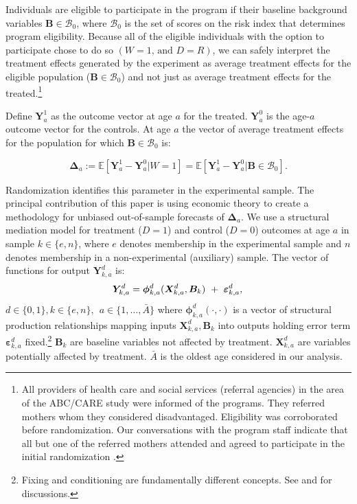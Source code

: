 Individuals are eligible to participate in the program if their baseline background variables $\bm{B}\in\mathcal{B}_0$, where $\mathcal{B}_0$ is the set of scores on the risk index that determines program eligibility. Because all of the eligible individuals with the option to participate chose to do so $(W=1\text{, and } D=R)$, we can safely interpret the treatment effects generated by the experiment as average treatment effects for the eligible population ($\bm{B}\in\mathcal{B}_0$) and not just as average treatment effects for the treated.\footnote{All providers of health care and social services (referral agencies) in the area of the ABC/CARE study were informed of the programs. They referred mothers whom they considered disadvantaged. Eligibility was corroborated before randomization. Our conversations with the program staff indicate that all but one of the referred mothers attended and agreed to participate in the initial randomization \citep{Ramey-etal_2012-ABC}.}

Define $\bm{Y}^1_a$ as the outcome vector at age $a$ for the treated. $\bm{Y}^0_a$ is the age-$a$ outcome vector for the controls. At age $a$ the vector of average treatment effects for the population for which $\bm{B}\in\mathcal{B}_0$ is:

\begin{equation}
\bm{\Delta}_a  := \mathbb{E} \left[ \bm{Y}^1_a - \bm{Y}^0_a | W = 1 \right] = \mathbb{E} \left[\bm{Y}^1_a - \bm{Y}^0_{a} | \bm{B} \in \mathcal{B}_0 \right]. \label{eq:mainte}
\end{equation}

Randomization identifies this parameter in the experimental sample. The principal contribution of this paper is using economic theory to create a methodology for unbiased out-of-sample forecasts of $\bm{\Delta}_a$. We use a structural mediation model for treatment ($D=1$) and control ($D=0$) outcomes at age $a$ in sample $k \in \{e,n\}$, where $e$ denotes membership in the experimental sample and $n$ denotes membership in a non-experimental (auxiliary) sample. The vector of functions for output $\bm{Y}^d_{k,a}$ is:
\begin{equation}
\bm{Y}^d_{k,a} = \bm{\phi}^d_{k,a} (\bm{X}^d_{k,a}, \bm{B}_k) \ + \ \bm{\varepsilon}^d_{k,a},  \label{eq:outcome} \\
\end{equation}
$d \in\{0,1\},  k\in\{e,n\}, \ \ a\in\{1,\dots,\bar{A}\}$ where $\bm{\phi}^d_{k,a}\left( \cdot, \cdot \right)$ is a vector of structural production relationships mapping inputs $\bm{X}^d_{k,a}, \bm{B}_k$ into outputs holding error term $\bm{\varepsilon}^d_{k,a}$ fixed.\footnote{Fixing and conditioning are fundamentally different concepts. See \cite{Haavelmo_1943_Econometrica} and \citet{Heckman_Pinto_2015_EconometTheory} for discussions.} $ \bm{B}_k$ are baseline variables not affected by treatment. $\bm{X}^d_{k,a}$ are variables potentially affected by treatment. $\bar{A}$ is the oldest age considered in our analysis.

